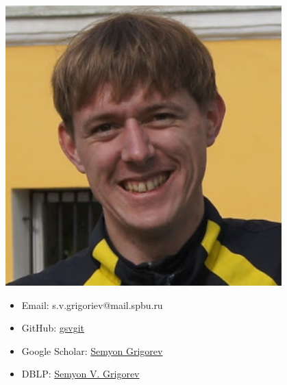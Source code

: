 \documentclass[xcolor=table,aspectratio=169]{beamer}
\begin{document}
\begin{frame}[fragile]
\begin{minipage}[t]{0.29\textwidth}
\begin{center}
\includegraphics[width=0.8\textwidth]{pictures/SemyonGrigorev.jpg}
  \end{center}
  {\scriptsize
\begin{itemize}    
  \item Email: s.v.grigoriev@mail.spbu.ru
  \item GitHub: \href{https://github.com/gsvgit}{gsvgit}
  \item Google Scholar: \href{https://scholar.google.com/citations?hl=ru&user=kP4dqUAAAAAJ&view_op=list_works&sortby=pubdate}{Semyon Grigorev}
  \item DBLP: \href{https://dblp.org/pid/181/9903.html}{Semyon V. Grigorev}
\end{itemize}
  }
\end{minipage}
\end{frame}
\end{document}
